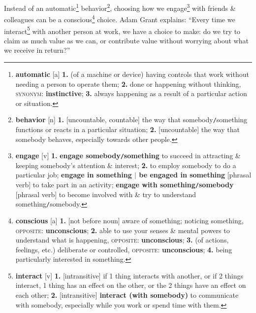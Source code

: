 \documentclass[oneside]{book}
\numberwithin{equation}{section}
\begin{document}
Instead of an automatic\footnote{\textbf{automatic} [a] \textbf{1.} (of a machine or device) having controls that work without needing a person to operate them; \textbf{2.} done or happening without thinking, \textsc{synonym}: \textbf{instinctive}; \textbf{3.} always happening as a result of a particular action or situation.} behavior\footnote{\textbf{behavior} [n] \textbf{1.} [uncountable, countable] the way that somebody\texttt{/}something functions or reacts in a particular situation; \textbf{2.} [uncountable] the way that somebody behaves, especially towards other people.}, choosing how we engage\footnote{\textbf{engage} [v] \textbf{1.} \textbf{engage somebody\texttt{/}something} to succeed in attracting \& keeping somebody's attention \& interest; \textbf{2.} to employ somebody to do a particular job; \textbf{engage in something $|$ be engaged in something} [phrasal verb] to take part in an activity; \textbf{engage with something\texttt{/}somebody} [phrasal verb] to become involved with \& try to understand something\texttt{/}somebody.} with friends \& colleagues can be a conscious\footnote{\textbf{conscious} [a] \textbf{1.} [not before noun] aware of something; noticing something, \textsc{opposite}: \textbf{unconscious}; \textbf{2.} able to use your senses \& mental powers to understand what is happening, \textsc{opposite}: \textbf{unconscious}; \textbf{3.} (of actions, feelings, etc.) deliberate or controlled, \textsc{opposite}: \textbf{unconscious}; \textbf{4.} being particularly interested in something.} choice. Adam Grant explains: ``Every time we interact\footnote{\textbf{interact} [v] \textbf{1.} [intransitive] if 1 thing interacts with another, or if 2 things interact, 1 thing has an effect on the other, or the 2 things have an effect on each other; \textbf{2.} [intransitive] \textbf{interact (with somebody)} to communicate with somebody, especially while you work or spend time with them.} with another person at work, we have a choice to make: do we try to claim as much value as we can, or contribute value without worrying about what we receive in return?''
\end{document}
